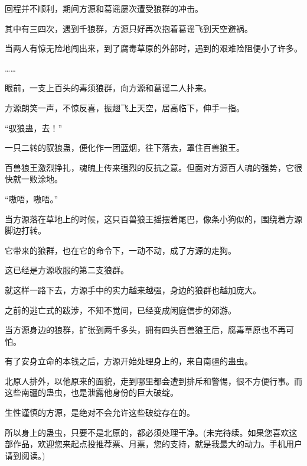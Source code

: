 \begin{this_body}
回程并不顺利，期间方源和葛谣屡次遭受狼群的冲击。

其中有三四次，遇到千狼群，方源只好再次抱着葛谣飞到天空避祸。

当两人有惊无险地闯出来，到了腐毒草原的外部时，遇到的艰难险阻便小了许多。

……

眼前，一支上百头的毒须狼群，向方源和葛谣二人扑来。

方源朗笑一声，不惊反喜，振翅飞上天空，居高临下，伸手一指。

“驭狼蛊，去！”

一只二转的驭狼蛊，便化作一团蓝烟，往下落去，罩住百兽狼王。

百兽狼王激烈挣扎，魂魄上传来强烈的反抗之意。但面对方源百人魂的强势，它很快就一败涂地。

“嗷唔，嗷唔。”

当方源落在草地上的时候，这只百兽狼王摇摆着尾巴，像条小狗似的，围绕着方源脚边打转。

它带来的狼群，也在它的命令下，一动不动，成了方源的走狗。

这已经是方源收服的第二支狼群。

就这样一路下去，方源手中的实力越来越强，身边的狼群也越加庞大。

之前的逃亡式的跋涉，不知不觉间，已经变成闲庭信步的郊游。

当方源身边的狼群，扩张到两千多头，拥有四头百兽狼王后，腐毒草原也不再可怕。

有了安身立命的本钱之后，方源开始处理身上的，来自南疆的蛊虫。

北原人排外，以他原来的面貌，走到哪里都会遭到排斥和警惕，很不方便行事。而这些南疆的蛊虫，也是泄露他身份的巨大破绽。

生性谨慎的方源，是绝对不会允许这些破绽存在的。

所以身上的蛊虫，只要不是北原的，都必须处理干净。(未完待续。如果您喜欢这部作品，欢迎您来起点投推荐票、月票，您的支持，就是我最大的动力。手机用户请到阅读。)

\end{this_body}

